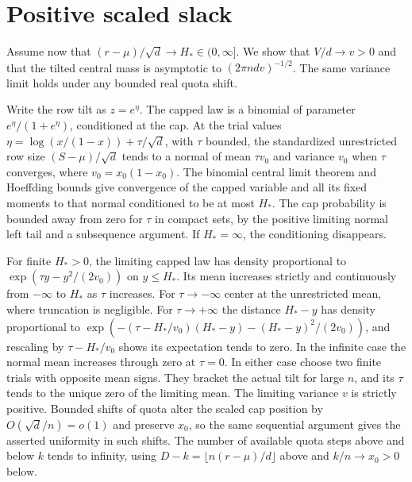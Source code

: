 \documentclass[11pt]{article}
\begin{document}
\section{Positive scaled slack}\label{sec:central}

Assume now that $(r-\mu)/\sqrt d\to H_*\in(0,\infty]$.
We show that $V/d\to v>0$ and that the tilted central mass is
asymptotic to $(2\pi n d v)^{-1/2}$. The same variance limit holds
under any bounded real quota shift.

Write the row tilt as $z=e^\eta$. The capped law is a
binomial of parameter $e^\eta/(1+e^\eta)$, conditioned at the cap.
At the trial values $\eta=\log(x/(1-x))+\tau/\sqrt d$, with $\tau$
bounded, the standardized unrestricted row size $(S-\mu)/\sqrt d$
tends to a normal of mean $\tau v_0$ and variance $v_0$ when
$\tau$ converges, where $v_0=x_0(1-x_0)$. The binomial central
limit theorem and Hoeffding bounds give convergence of the
capped variable and all its fixed moments to that normal
conditioned to be at most $H_*$. The cap probability is bounded
away from zero for $\tau$ in compact sets, by the positive
limiting normal left tail and a subsequence argument. If
$H_*=\infty$, the conditioning disappears.

For finite $H_*>0$, the limiting capped law has density proportional
to $\exp(\tau y-y^2/(2v_0))$ on $y\le H_*$. Its mean increases
strictly and continuously from $-\infty$ to $H_*$ as $\tau$ increases.
For $\tau\to-\infty$ center at the unrestricted mean, where truncation
is negligible. For $\tau\to+\infty$ the distance $H_*-y$ has density
proportional to
$\exp(-(\tau-H_*/v_0)(H_*-y)-(H_*-y)^2/(2v_0))$, and rescaling by
$\tau-H_*/v_0$ shows its expectation tends to zero. In the infinite
case the normal mean increases through zero at $\tau=0$.
In either case choose two finite trials with opposite mean signs.
They bracket the actual tilt for large $n$, and its $\tau$ tends to
the unique zero of the limiting mean. The limiting variance $v$
is strictly positive. Bounded shifts of quota alter the scaled
cap position by $O(\sqrt d/n)=o(1)$ and preserve $x_0$, so the
same sequential argument gives the asserted uniformity in such
shifts. The number of available quota steps above and below
$k$ tends to infinity, using
$D-k=\lfloor n(r-\mu)/d\rfloor$ above and $k/n\to x_0>0$ below.
\end{document}
